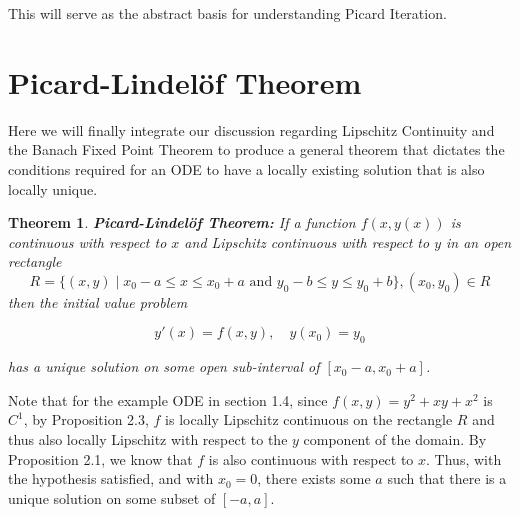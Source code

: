 \documentclass{article}
\newtheorem{theorem}{Theorem}[section]
\theoremstyle{remark}
\begin{document}
This will serve as the abstract basis for understanding Picard Iteration.

\section{Picard-Lindelöf Theorem}
Here we will finally integrate our discussion regarding Lipschitz Continuity and the Banach Fixed Point Theorem to produce a general theorem that dictates the conditions required for an ODE to have a locally existing solution that is also locally unique.




\begin{theorem}\textbf{Picard-Lindelöf Theorem: }If a function $f(x,y(x))$ is continuous with respect to $x$ and Lipschitz continuous with respect to $y$ in an open rectangle
$$R = \{(x,y)\mid x_0-a\leq x \leq x_0+a \text{ and } y_0-b\leq y\leq y_0+b\}, (x_0, y_0) \in R$$
then the initial value problem 

$$y'(x) = f(x,y), \quad y(x_0) = y_0$$

has a unique solution on some open sub-interval of $[x_0-a, x_0+a]$.
\end{theorem}

Note that for the example ODE in section 1.4, since $f(x,y) = y^2 +xy + x^2$ is $C^1$, by Proposition 2.3, $f$ is locally Lipschitz continuous on the rectangle $R$ and thus also locally Lipschitz with respect to the $y$ component of the domain. By Proposition 2.1, we know that $f$ is also continuous with respect to $x$.  Thus, with the hypothesis satisfied, and with $x_0 = 0$, there exists some $a$ such that there is a unique solution on some subset of $[-a, a]$.\\
\end{document}
